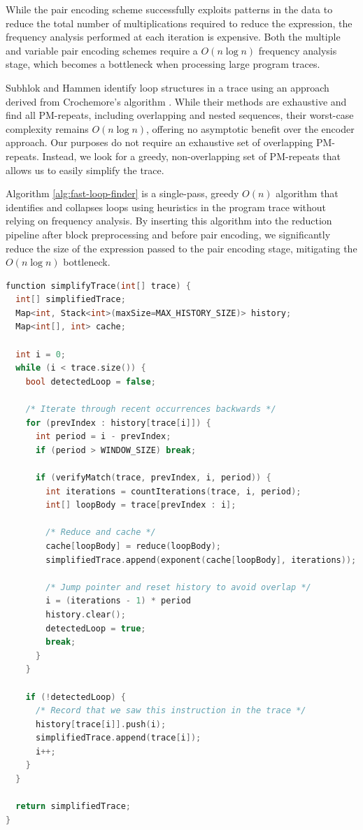 While the pair encoding scheme successfully exploits patterns in the data to reduce the total number of multiplications 
required to reduce the expression, the frequency analysis performed at each iteration is expensive. Both the multiple
and variable pair encoding schemes require a $O(n\log n)$ frequency analysis stage, which becomes a bottleneck when
processing large program traces. 

Subhlok and Hammen \cite{PMRepeats} identify loop structures in a trace using an approach derived from 
Crochemore's algorithm \cite{Crochemore}. While their methods are exhaustive and find all PM-repeats, including
overlapping and nested sequences, their worst-case complexity remains $O(n\log n)$, offering no asymptotic benefit over
the encoder approach. Our purposes do not require an exhaustive set of overlapping PM-repeats. Instead, we look for a
greedy, non-overlapping set of PM-repeats that allows us to easily simplify the trace.

Algorithm \ref{alg:fast-loop-finder} is a single-pass, greedy $O(n)$ algorithm 
that identifies and collapses loops using heuristics in the program trace without relying on frequency analysis.
By inserting this algorithm into the reduction pipeline after block preprocessing and before pair encoding, we
significantly reduce the size of the expression passed to the pair encoding stage, mitigating the $O(n\log n)$ bottleneck.

\begin{algfloat}[ht]
\begin{lstlisting}[language=C++]
function simplifyTrace(int[] trace) {
  int[] simplifiedTrace;
  Map<int, Stack<int>(maxSize=MAX_HISTORY_SIZE)> history;
  Map<int[], int> cache;

  int i = 0;
  while (i < trace.size()) {
    bool detectedLoop = false;

    /* Iterate through recent occurrences backwards */
    for (prevIndex : history[trace[i]]) {
      int period = i - prevIndex;
      if (period > WINDOW_SIZE) break;

      if (verifyMatch(trace, prevIndex, i, period)) {
        int iterations = countIterations(trace, i, period);
        int[] loopBody = trace[prevIndex : i];

        /* Reduce and cache */
        cache[loopBody] = reduce(loopBody);
        simplifiedTrace.append(exponent(cache[loopBody], iterations));

        /* Jump pointer and reset history to avoid overlap */
        i = (iterations - 1) * period
        history.clear();
        detectedLoop = true;
        break;
      }
    }
    
    if (!detectedLoop) {
      /* Record that we saw this instruction in the trace */
      history[trace[i]].push(i);
      simplifiedTrace.append(trace[i]);
      i++;
    }
  }

  return simplifiedTrace;
}
\end{lstlisting}
\caption{Fast loop-finding algorithm}
\label{alg:fast-loop-finder}
\end{algfloat}

